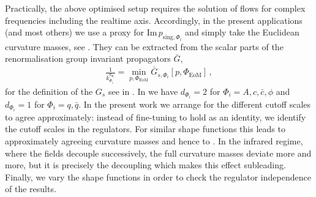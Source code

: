 \documentclass[aps,twocolumn,prd,superscriptaddress]{revtex4-2}
\begin{document}
Practically, the above optimised setup requires the solution of flows for complex frequencies including the realtime axis. Accordingly, in the present applications (and most others) we use a proxy for $\textrm{Im}\, p_{\textrm{sing},\Phi_i}$ and simply take the Euclidean curvature masses, see \cite{Helmboldt:2014iya}. They can be extracted from the scalar parts of the renormalisation group invariant propagators $\bar G$, 
%
\begin{align}
	\frac{1}{k^{d_{\Phi_i}}_{\Phi_i}}= \min\limits_{p,\Phi_\textrm{EoM}} \bar G_{s,\Phi_i}[p,\Phi_\textrm{EoM}]\,, 
\label{eq:Physcutoffscales}
\end{align}
% 
for the definition of the $G_s$ see  in . In  we have $d_{\Phi_i} =2$ for $\Phi_i=A,c,\bar c,\phi$ and $d_{\Phi_i} =1$ for $\Phi_i=q,\bar q$. In the present work we arrange for the different cutoff scales to agree approximately: instead of fine-tuning  to hold as an identity, we identify the cutoff scales in the regulators. For similar shape functions this leads to approximately agreeing curvature masses  and hence to . In the infrared regime, where the fields decouple successively, the full curvature masses deviate more and more, but it is precisely the decoupling which makes this effect subleading. Finally, we vary the shape functions in order to check the regulator independence of the results. 
\end{document}
